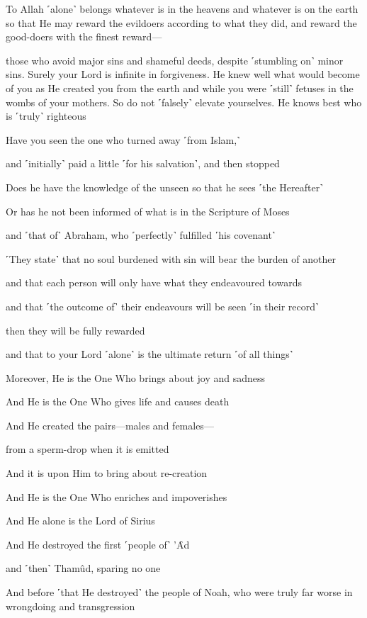 To Allah ˹alone˺ belongs whatever is in the heavens and whatever is on the earth so that He may reward the evildoers according to what they did, and reward the good-doers with the finest reward—

those who avoid major sins and shameful deeds, despite ˹stumbling on˺ minor sins. Surely your Lord is infinite in forgiveness. He knew well what would become of you as He created you from the earth and while you were ˹still˺ fetuses in the wombs of your mothers. So do not ˹falsely˺ elevate yourselves. He knows best who is ˹truly˺ righteous

Have you seen the one who turned away ˹from Islam,˺

and ˹initially˺ paid a little ˹for his salvation˺, and then stopped

Does he have the knowledge of the unseen so that he sees ˹the Hereafter˺

Or has he not been informed of what is in the Scripture of Moses

and ˹that of˺ Abraham, who ˹perfectly˺ fulfilled ˹his covenant˺

˹They state˺ that no soul burdened with sin will bear the burden of another

and that each person will only have what they endeavoured towards

and that ˹the outcome of˺ their endeavours will be seen ˹in their record˺

then they will be fully rewarded

and that to your Lord ˹alone˺ is the ultimate return ˹of all things˺

Moreover, He is the One Who brings about joy and sadness

And He is the One Who gives life and causes death

And He created the pairs—males and females—

from a sperm-drop when it is emitted

And it is upon Him to bring about re-creation

And He is the One Who enriches and impoverishes

And He alone is the Lord of Sirius

And He destroyed the first ˹people of˺ ’Ȃd

and ˹then˺ Thamûd, sparing no one

And before ˹that He destroyed˺ the people of Noah, who were truly far worse in wrongdoing and transgression

